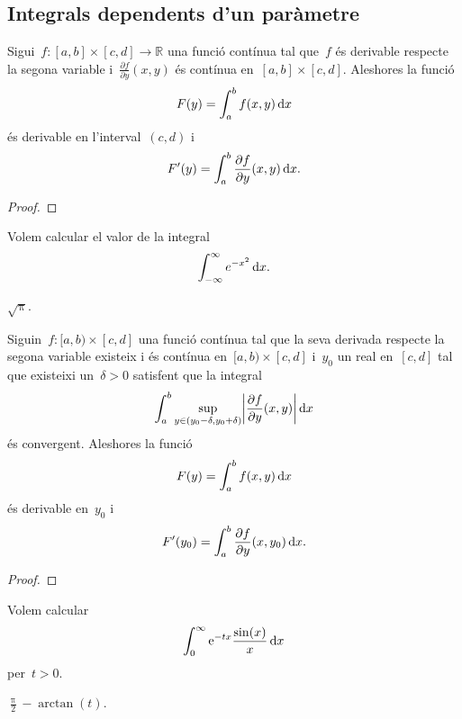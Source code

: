 \documentclass[../../main.tex]{subfiles}
\begin{document}
    \subsection{Integrals dependents d'un paràmetre}
    \begin{theorem}
        \label{thm:criteri per la derivació sota el signe de la integral}
        Sigui~\(f\colon[a,b]\times[c,d]\longrightarrow\mathbb{R}\) una funció contínua tal que~\(f\) és derivable respecte la segona variable i~\(\frac{\partial f}{\partial y}(x,y)\) és contínua en~\([a,b]\times[c,d]\).
        Aleshores la funció
        \[
            F(y)=\int_{a}^{b}f(x,y)\mathop{}\!\mathrm{d} x
        \]
        és derivable en l'interval~\((c,d)\) i
        \[
            F'(y)=\int_{a}^{b}\frac{\partial f}{\partial y}(x,y)\mathop{}\!\mathrm{d} x.
        \]
        \begin{proof}
        \end{proof}
    \end{theorem}
    \begin{example}
        \label{ex:integral de Gauss}
        Volem calcular el valor de la integral
        \[
            \int_{-\infty}^{\infty}e^{-x^{2}}\mathop{}\!\mathrm{d} x.
        \] %
        \begin{solution}
            \(\sqrt{\uppi}\).
        \end{solution}
    \end{example}
    \begin{theorem}
        \label{thm:criteri per la derivabilitat sota el signe de la integral}
        Siguin~\(f\colon[a,b)\times[c,d]\) una funció contínua tal que la seva derivada respecte la segona variable existeix i és contínua en~\([a,b)\times[c,d]\) i~\(y_{0}\) un real en~\([c,d]\) tal que existeixi un~\(\delta>0\) satisfent que la integral
        \[
            \int_{a}^{b}\sup_{y\in(y_{0}-\delta,y_{0}+\delta)}\abs{\frac{\partial f}{\partial y}(x,y)}\diff x
        \]
        és convergent.
        Aleshores la funció
        \[
            F(y)=\int_{a}^{b}f(x,y)\mathop{}\!\mathrm{d} x
        \]
        és derivable en~\(y_{0}\) i
        \[
            F'(y_{0})=\int_{a}^{b}\frac{\partial f}{\partial y}(x,y_{0})\mathop{}\!\mathrm{d} x.
        \]
        \begin{proof}
        \end{proof}
    \end{theorem}
    \begin{example}
        \label{ex:trobar una funció derivant sota el signe de la integral}
        Volem calcular
        \[
            \int_{0}^{\infty}\mathrm{e}^{-tx}\frac{\sin(x)}{x}\mathop{}\!\mathrm{d} x
        \]
        per~\(t>0\).
        \begin{solution}
            \(\frac{\uppi}{2}-\arctan(t)\).
        \end{solution}
    \end{example}
\end{document}

